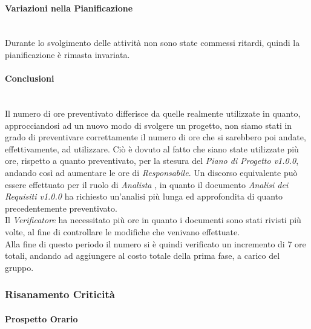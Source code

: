 \paragraph{Variazioni nella Pianificazione} ~\\
Durante lo svolgimento delle attività non sono state commessi ritardi, quindi la pianificazione è rimasta invariata.


\paragraph{Conclusioni} \-\\
Il numero di ore preventivato differisce da quelle realmente utilizzate in quanto, approcciandosi ad un nuovo modo di svolgere un progetto, non siamo stati in grado di preventivare correttamente il numero di ore che si sarebbero poi andate, effettivamente, ad utilizzare. Ciò è dovuto al fatto che siano state utilizzate più ore, rispetto a quanto preventivato, per la stesura del \textit{Piano di Progetto v1.0.0}, andando così ad aumentare le ore di \textit{Responsabile}. Un discorso equivalente può essere effettuato per il ruolo di \textit{Analista} , in quanto il documento \textit{Analisi dei Requisiti v1.0.0} ha richiesto un'analisi più lunga ed approfondita di quanto precedentemente preventivato. \\
Il \textit{Verificatore} ha necessitato più ore in quanto i documenti sono stati rivisti più volte, al fine di controllare le modifiche che venivano effettuate. \\
Alla fine di questo periodo il numero si è quindi verificato un incremento di 7 ore totali, andando ad aggiungere  al costo totale della prima fase, a carico del gruppo. 

\subsubsection{Risanamento Criticità}
\label{RA1}

\paragraph{Prospetto Orario} \-\\


